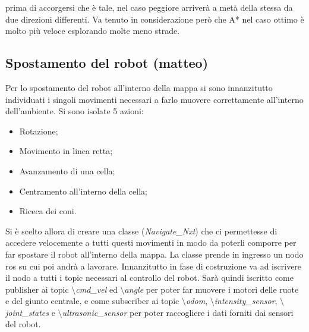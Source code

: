 \documentclass[english]{article}
\begin{document}
prima di accorgersi che è tale, nel caso peggiore arriverà a metà della stessa da due direzioni differenti. Va tenuto in considerazione però che A* nel caso ottimo è molto più veloce esplorando molte meno strade.
  
  
  
\subsection{Spostamento del robot (matteo)}
Per lo spostamento del robot all'interno della mappa si sono innanzitutto individuati i singoli movimenti necessari a farlo muovere correttamente all'interno dell'ambiente. Si sono isolate 5 azioni:
\begin{itemize}
\item Rotazione;
\item Movimento in linea retta;
\item Avanzamento di una cella;
\item Centramento all'interno della cella;
\item Riceca dei coni.
\end{itemize}

Si è scelto allora di creare una classe (\textit{Navigate\_Nxt}) che ci permettesse di accedere velocemente a tutti questi movimenti in modo da poterli comporre per far spostare il robot all'interno della mappa. La classe prende in ingresso un nodo ros su cui poi andrà a lavorare. Innanzitutto in fase di costruzione va ad iscrivere il nodo a tutti i topic necessari al controllo del robot. Sarà quindi iscritto come publisher ai topic \textit{$\setminus$cmd\_vel} ed \textit{$\setminus$angle} per poter far muovere i motori delle ruote e del giunto centrale, e come subscriber ai topic \textit{$\setminus$odom}, \textit{$\setminus$intensity\_sensor}, \textit{$\setminus$joint\_states} e \textit{$\setminus$ultrasonic\_sensor} per poter raccogliere i dati forniti dai sensori del robot.
\end{document}

